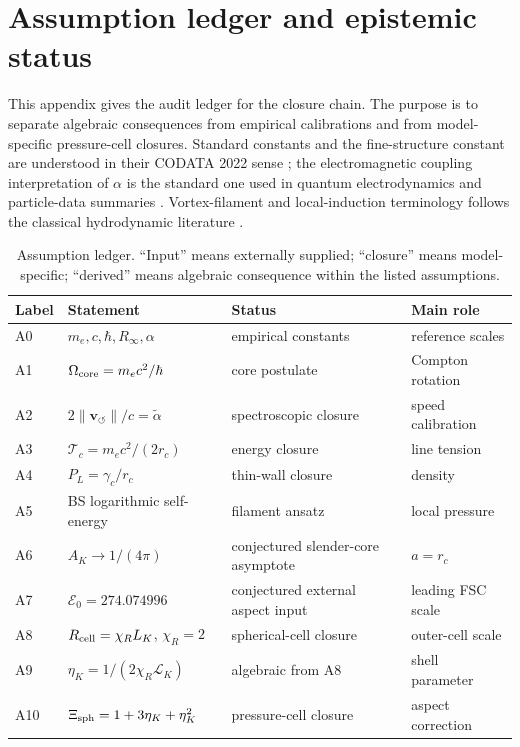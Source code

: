 \documentclass[aps,pra,preprint,longbibliography,nofootinbib]{revtex4-2}
\newcommand{\vnorm}{\lVert\mathbf{v}_{\!\boldsymbol{\circlearrowleft}}\rVert} %
\newcommand{\Tc}{\mathcal{T}_c}                  %
\begin{document}
\appendix

\section{Assumption ledger and epistemic status}
\label{app:assumptions}

This appendix gives the audit ledger for the closure chain.  The purpose is
to separate algebraic consequences from empirical calibrations and from
model-specific pressure-cell closures.  Standard constants and the
fine-structure constant are understood in their CODATA 2022 sense
\cite{MohrTaylor2022}; the electromagnetic coupling interpretation of
$\alpha$ is the standard one used in quantum electrodynamics and particle-data
summaries \cite{PeskinSchroeder1995,PDG2022}.  Vortex-filament and
local-induction terminology follows the classical hydrodynamic literature
\cite{Batchelor1967,Saffman1992,Donnelly1991}.

\begin{table}[h]
\centering
\caption{Assumption ledger.  ``Input'' means externally supplied; ``closure''
means model-specific; ``derived'' means algebraic consequence within the
listed assumptions.}
\label{tab:app_assumption_ledger}
\scriptsize
\begin{tabular}{@{}llll@{}}
\toprule
Label & Statement & Status & Main role \\
\midrule
A0 & $m_e,c,\hbar,R_\infty,\alpha$ & empirical constants & reference scales \\
A1 & $\Omega_{\rm core}=m_ec^2/\hbar$ & core postulate & Compton rotation \\
A2 & $2\vnorm/c=\tilde\alpha$ & spectroscopic closure & speed calibration \\
A3 & $\Tc=m_ec^2/(2r_c)$ & energy closure & line tension \\
A4 & $P_L=\gamma_c/r_c$ & thin-wall closure & density \\
A5 & BS logarithmic self-energy & filament ansatz & local pressure \\
A6 & $A_K\to1/(4\pi)$ & conjectured slender-core asymptote & $a=r_c$ \\
A7 & $\mathcal E_0=274.074996$ & conjectured external aspect input & leading FSC scale \\
A8 & $R_{\rm cell}=\chi_R L_K$, $\chi_R=2$ & spherical-cell closure & outer-cell scale \\
A9 & $\eta_K=1/(2\chi_R\mathcal L_K)$ & algebraic from A8 & shell parameter \\
A10 & $\Xi_{\rm sph}=1+3\eta_K+\eta_K^2$ & pressure-cell closure & aspect correction \\
\bottomrule
\end{tabular}
\end{table}
\end{document}
